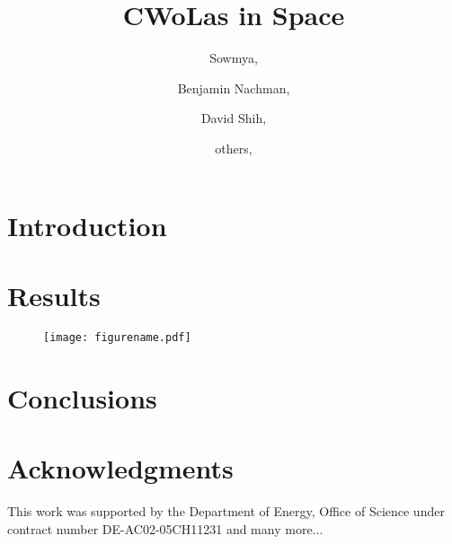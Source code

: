 \documentclass[12pt,prd]{article}
\begin{document}
 \title{CWoLas in Space}

 \author[1]{Sowmya,} 
 \author[2]{Benjamin Nachman,}
 \author[3]{David Shih,}
 \author[5]{others,}



 \maketitle
  
 \section{Introduction}\label{sec:intro}

 \section{Results}\label{sec:results}

 \begin{figure}[h!]
 \centering
 \texttt{[image: figurename.pdf]}
 \end{figure}

 \section{Conclusions} \label{sec:conclusions}


 \section*{\label{sec::acknowledgments}Acknowledgments}

 This work was supported by the Department of Energy, Office of Science under contract number DE-AC02-05CH11231 and many more...

 
 


 
\end{document}
